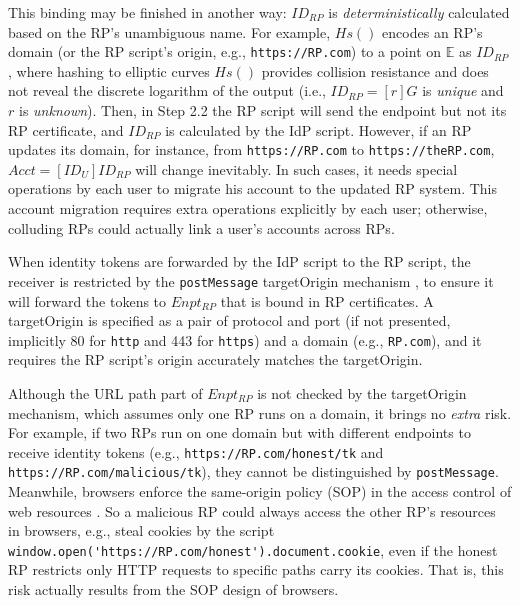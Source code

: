 This binding may be finished in another way:
    $ID_{RP}$ is \emph{deterministically} calculated based on the RP's unambiguous name.
For example, $Hs()$ encodes an RP's domain (or the RP script's origin, e.g., \verb+https://RP.com+) to
 a point on $\mathbb{E}$ as $ID_{RP}$,
where
    hashing to elliptic curves $Hs()$ \cite{irtf-cfrg-hash-to-curve-16} provides collision resistance
     and does not reveal the discrete logarithm of the output
    (i.e., $ID_{RP} = [r]G$ is \emph{unique} and $r$ is \emph{unknown}).
Then,  in Step 2.2 the RP script will send the endpoint but not its RP certificate,
 and $ID_{RP}$ is calculated by the IdP script.
However, if an RP updates its domain, for instance, from \verb+https://RP.com+ to \verb+https://theRP.com+,
$Acct = [ID_U]ID_{RP}$ will change inevitably.
In such cases,
    it needs special operations by each user to migrate his account
            to the updated RP system.
This account migration requires extra operations explicitly by each user;
    otherwise,
        colluding RPs could actually link a user's accounts across RPs.


\vspace{0.75mm}
When identity tokens are forwarded by the IdP script to the RP script, %
    the receiver is restricted by the \verb+postMessage+ targetOrigin mechanism \cite{postm-targeto},
        to ensure it will forward the tokens to $Enpt_{RP}$
        that is bound in RP certificates.
A targetOrigin is specified as
a pair of protocol and port (if not presented, implicitly 80 for \verb+http+ and 443 for \verb+https+)
    and a domain (e.g., \verb+RP.com+),
        and it requires the RP script's origin accurately matches the targetOrigin.

Although the URL path part of $Enpt_{RP}$ %
 is not checked by the targetOrigin mechanism,
  which assumes only one RP runs on a domain,
   it brings no \emph{extra} risk.
For example, if two RPs run on one domain but with different endpoints to receive identity tokens
        (e.g., \verb+https://RP.com/honest/tk+ and \verb+https://RP.com/malicious/tk+),
         they cannot be distinguished by \verb+postMessage+.
Meanwhile, browsers enforce
 the same-origin policy (SOP) in the access control of web resources \cite{sop}.
So
    a malicious RP could always access the other RP's resources in browsers,
        e.g., steal cookies
        by the script
        \verb+window.open('https://RP.com/honest').document.cookie+,
    even if the honest RP restricts only HTTP requests to specific paths carry its cookies.
That is, this risk actually results from the SOP design of browsers.



